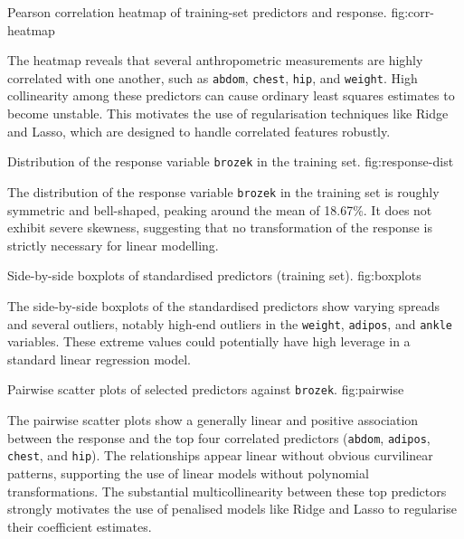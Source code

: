 %
    {Pearson correlation heatmap of training-set predictors and response.}%
    {fig:corr-heatmap}

The heatmap reveals that several anthropometric measurements are highly correlated with one another, such as \texttt{abdom}, \texttt{chest}, \texttt{hip}, and \texttt{weight}. High collinearity among these predictors can cause ordinary least squares estimates to become unstable. This motivates the use of regularisation techniques like Ridge and Lasso, which are designed to handle correlated features robustly.

%
    {Distribution of the response variable \texttt{brozek} in the training set.}%
    {fig:response-dist}

The distribution of the response variable \texttt{brozek} in the training set is roughly symmetric and bell-shaped, peaking around the mean of 18.67\%. It does not exhibit severe skewness, suggesting that no transformation of the response is strictly necessary for linear modelling.

%
    {Side-by-side boxplots of standardised predictors (training set).}%
    {fig:boxplots}

The side-by-side boxplots of the standardised predictors show varying spreads and several outliers, notably high-end outliers in the \texttt{weight}, \texttt{adipos}, and \texttt{ankle} variables. These extreme values could potentially have high leverage in a standard linear regression model.

%
    {Pairwise scatter plots of selected predictors against \texttt{brozek}.}%
    {fig:pairwise}

The pairwise scatter plots show a generally linear and positive association between the response and the top four correlated predictors (\texttt{abdom}, \texttt{adipos}, \texttt{chest}, and \texttt{hip}). The relationships appear linear without obvious curvilinear patterns, supporting the use of linear models without polynomial transformations. The substantial multicollinearity between these top predictors strongly motivates the use of penalised models like Ridge and Lasso to regularise their coefficient estimates.
